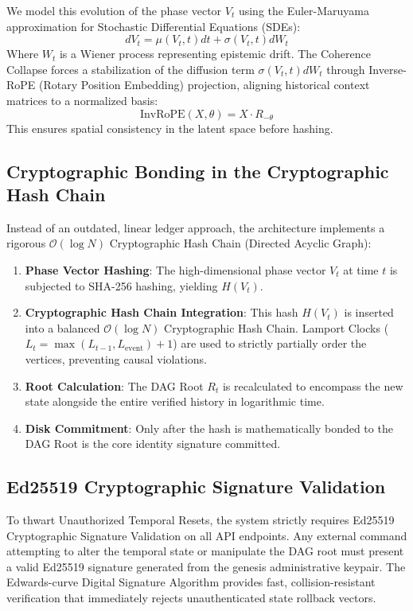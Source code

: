 \documentclass[11pt,a4paper]{article}
\begin{document}
We model this evolution of the phase vector $V_t$ using the Euler-Maruyama approximation for Stochastic Differential Equations (SDEs):
\begin{equation}
    dV_t = \mu(V_t, t)dt + \sigma(V_t, t)dW_t
\end{equation}
Where $W_t$ is a Wiener process representing epistemic drift. The Coherence Collapse forces a stabilization of the diffusion term $\sigma(V_t, t)dW_t$ through Inverse-RoPE (Rotary Position Embedding) projection, aligning historical context matrices to a normalized basis:
\begin{equation}
    \text{InvRoPE}(X, \theta) = X \cdot R_{-\theta}
\end{equation}
This ensures spatial consistency in the latent space before hashing.

\subsection{Cryptographic Bonding in the Cryptographic Hash Chain}
Instead of an outdated, linear ledger approach, the architecture implements a rigorous $\mathcal{O}(\log N)$ Cryptographic Hash Chain (Directed Acyclic Graph):

\begin{enumerate}
    \item \textbf{Phase Vector Hashing}: The high-dimensional phase vector $V_t$ at time $t$ is subjected to SHA-256 hashing, yielding $H(V_t)$.
    \item \textbf{Cryptographic Hash Chain Integration}: This hash $H(V_t)$ is inserted into a balanced $\mathcal{O}(\log N)$ Cryptographic Hash Chain. Lamport Clocks ($L_t = \max(L_{t-1}, L_{\text{event}}) + 1$) are used to strictly partially order the vertices, preventing causal violations.
    \item \textbf{Root Calculation}: The DAG Root $R_t$ is recalculated to encompass the new state alongside the entire verified history in logarithmic time.
    \item \textbf{Disk Commitment}: Only after the hash is mathematically bonded to the DAG Root is the core identity signature committed.
\end{enumerate}

\subsection{Ed25519 Cryptographic Signature Validation}
To thwart Unauthorized Temporal Resets, the system strictly requires Ed25519 Cryptographic Signature Validation on all API endpoints. Any external command attempting to alter the temporal state or manipulate the DAG root must present a valid Ed25519 signature generated from the genesis administrative keypair. The Edwards-curve Digital Signature Algorithm provides fast, collision-resistant verification that immediately rejects unauthenticated state rollback vectors.
\end{document}
